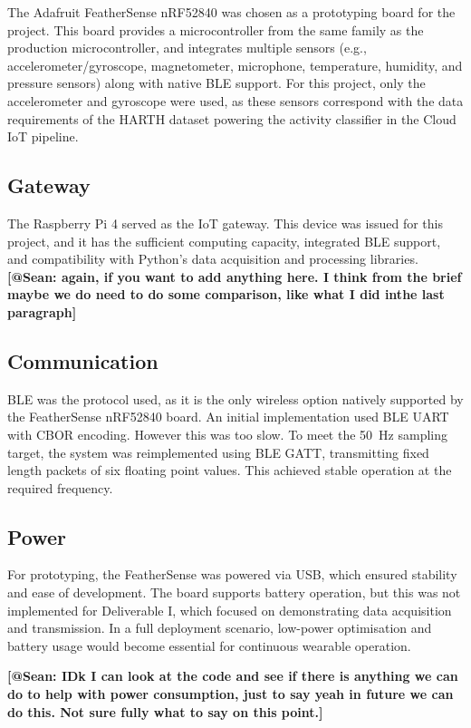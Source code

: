 \documentclass[conference]{IEEEtran}
\begin{document}
The Adafruit FeatherSense nRF52840\cite{b7} was chosen as a prototyping board for the project. This board provides a microcontroller from the same family as the production microcontroller, and integrates multiple sensors (e.g., accelerometer/gyroscope, magnetometer, microphone, temperature, humidity, and pressure sensors) along with native BLE support. For this project, only the accelerometer and gyroscope were used, as these sensors correspond with the data requirements of the HARTH dataset \cite{b5,b6} powering the activity classifier in the Cloud IoT pipeline.

\subsection{Gateway}
The Raspberry Pi 4 served as the IoT gateway. This device was issued for this project, and it has the sufficient computing capacity, integrated BLE support, and compatibility with Python's data acquisition and processing libraries. 
\textbf{[@Sean: again, if you want to add anything here. I think from the brief maybe we do need to do some comparison, like what I did inthe last paragraph]} 

\subsection{Communication}
BLE was the protocol used, as it is the only wireless option natively supported by the FeatherSense nRF52840 board. An initial implementation used BLE UART with CBOR encoding. However this was too slow. To meet the 50~Hz sampling target, the system was reimplemented using BLE GATT, transmitting fixed length packets of six floating point values. This achieved stable operation at the required frequency.

\subsection{Power}
For prototyping, the FeatherSense was powered via USB, which ensured stability and ease of development. The board supports battery operation, but this was not implemented for Deliverable I, which focused on demonstrating data acquisition and transmission. In a full deployment scenario, low-power optimisation and battery usage would become essential for continuous wearable operation.

\textbf{[@Sean: IDk I can look at the code and see if there is anything we can do to help with power consumption, just to say yeah in future we can do this. Not sure fully what to say on this point.]} 
\end{document}
